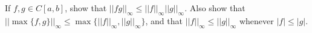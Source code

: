 \begin{exercise}{62}
    If $f, g \in C[a, b]$, show that $\lvert \lvert f g \rvert \rvert_{\infty} \leq \lvert \lvert f \rvert \rvert_{\infty} \lvert \lvert g \rvert \rvert_{\infty}$.
    Also show that $\lvert \lvert \max \{f, g\} \rvert \rvert_{\infty} \leq \max \{ \lvert \lvert f \rvert \rvert_{\infty}, \lvert \lvert g \rvert \rvert_{\infty}\}$, and that $\lvert \lvert f \rvert \rvert_{\infty} \leq \lvert \lvert g \rvert \rvert_{\infty}$ whenever $\lvert f \rvert \leq \lvert g \rvert$.
\end{exercise}

\begin{solution}
    
    
\end{solution}